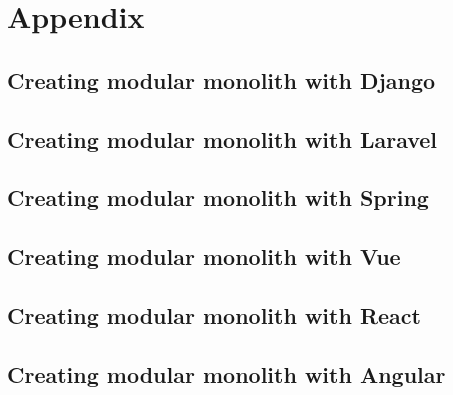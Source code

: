 \chapter{Appendix}

\section{Creating modular monolith with Django}
\label{sec:DjangoImpl}


\section{Creating modular monolith with Laravel}
\label{sec:LaravelImpl}


\section{Creating modular monolith with Spring}
\label{sec:SpringImpl}


\section{Creating modular monolith with Vue}
\label{sec:VueImpl}


\section{Creating modular monolith with React}
\label{sec:ReactImpl}


\section{Creating modular monolith with Angular}
\label{sec:AngularImpl}

